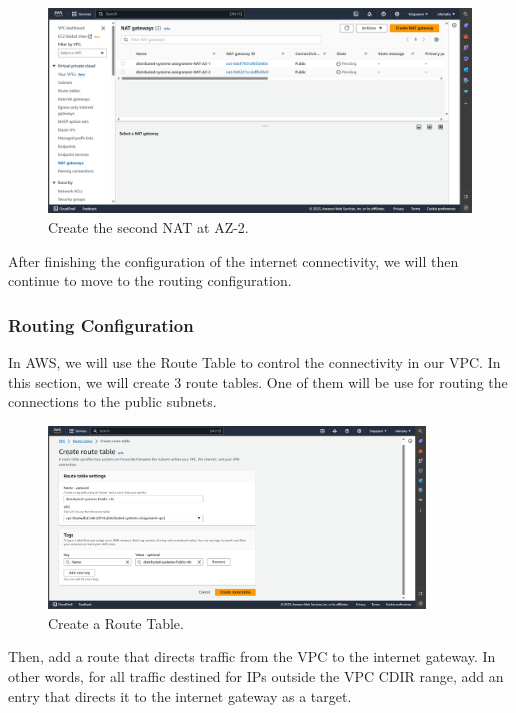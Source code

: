 \documentclass{article}
\begin{document}
\newpage
\begin{figure}[h]
    \centering
    \includegraphics[width=12cm]{Pictures/Networking and Security/NAT_create_2.png}
    \caption{Create the second NAT at AZ-2.}
    \label{fig:enter-label}
\end{figure}

After finishing the configuration of the internet connectivity, we will then continue to move to the routing configuration.

\subsubsection{Routing Configuration}
In AWS, we will use the Route Table to control the connectivity in our VPC. In this section, we will create 3 route tables. One of them will be use for routing the connections to the public subnets.\par

\begin{figure}[h]
    \centering
    \includegraphics[width=10cm]{Pictures/Networking and Security/route_table_create.png}
    \caption{Create a Route Table.}
    \label{fig:enter-label}
\end{figure}

Then, add a route that directs traffic from the VPC to the internet gateway. In other words, for all traffic destined for IPs outside the VPC CDIR range, add an entry that directs it to the internet gateway as a target.\par
\end{document}
